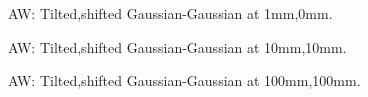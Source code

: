 \documentclass[aps,twoside,secnumarabic,balancelastpage,amsmath,amssymb,nofootinbib,hyperref=pdftex]{revtex4}
\begin{document}
	\begin{figure}
	\centering
	\caption{AW: Tilted,shifted Gaussian-Gaussian at 1mm,0mm.}
	\label{fig:21}
	\end{figure}
	
		\begin{figure}
	\centering
	\caption{AW: Tilted,shifted Gaussian-Gaussian at 10mm,10mm.}
	\label{fig:22}
	\end{figure}
	

	\begin{figure}
	\centering
	\caption{AW: Tilted,shifted Gaussian-Gaussian at 100mm,100mm.}
	\label{fig:23}
	\end{figure}
\clearpage
\end{document}
